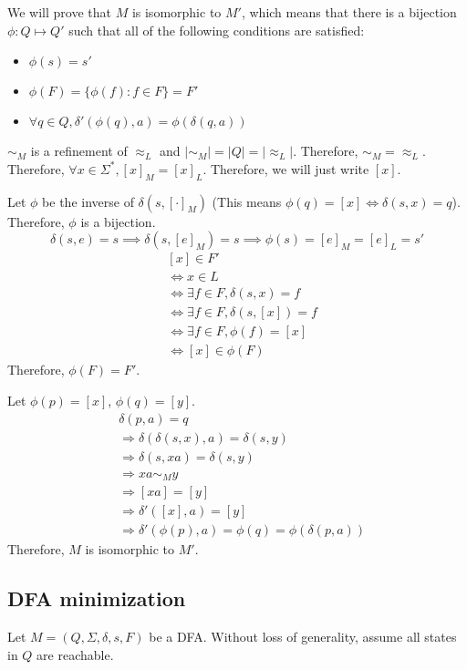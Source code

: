 We will prove that $M$ is isomorphic to $M'$,
which means that there is a bijection $\phi: Q \mapsto Q'$
such that all of the following conditions are satisfied:
\begin{itemize}
\item $\phi(s) = s'$
\item $\phi(F) = \{\phi(f): f \in F\} = F'$
\item $\forall q \in Q, \delta'(\phi(q), a) = \phi(\delta(q, a))$
\end{itemize}

$\sim_M$ is a refinement of $\approx_L$
and $|\sim_M| = |Q| = |\approx_L|$.
Therefore, $\sim_M = \approx_L$.
Therefore, $\forall x \in \Sigma^*, [x]_M = [x]_L$.
Therefore, we will just write $[x]$.

Let $\phi$ be the inverse of $\delta(s, [\cdot]_M)$
(This means $\phi(q) = [x] \iff \delta(s, x) = q$).
Therefore, $\phi$ is a bijection.
\[ \delta(s, e) = s \implies \delta(s, [e]_M) = s \implies \phi(s) = [e]_M = [e]_L = s' \]
\begin{align*}
& [x] \in F'
\\ &\iff x \in L
\\ &\iff \exists f \in F, \delta(s, x) = f
\\ &\iff \exists f \in F, \delta(s, [x]) = f
\\ &\iff \exists f \in F, \phi(f) = [x]
\\ &\iff [x] \in \phi(F)
\end{align*}
Therefore, $\phi(F) = F'$.

Let $\phi(p) = [x]$, $\phi(q) = [y]$.
\begin{align*}
& \delta(p, a) = q
\\ &\Rightarrow \delta(\delta(s, x), a) = \delta(s, y)
\\ &\Rightarrow \delta(s, xa) = \delta(s, y)
\\ &\Rightarrow xa \sim_M y
\\ &\Rightarrow [xa] = [y]
\\ &\Rightarrow \delta'([x], a) = [y]
\\ &\Rightarrow \delta'(\phi(p), a) = \phi(q) = \phi(\delta(p, a))
\end{align*}
Therefore, $M$ is isomorphic to $M'$.

\subsection{DFA minimization}

Let $M = (Q, \Sigma, \delta, s, F)$ be a DFA.
Without loss of generality, assume all states in $Q$ are reachable.

